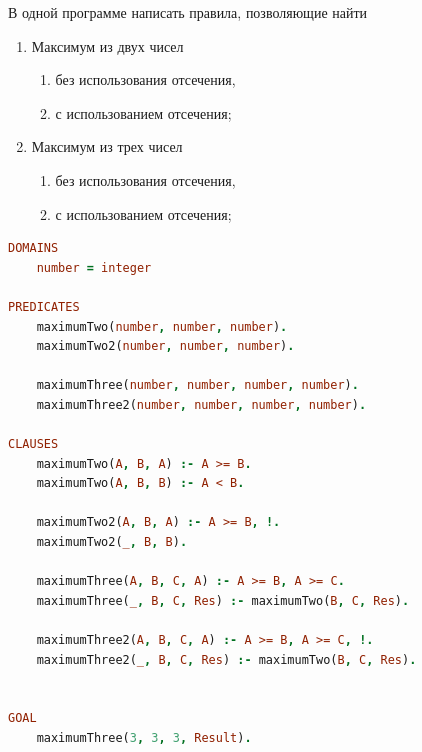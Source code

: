 \documentclass[a4paper,oneside,12pt]{extreport}
\begin{document}
\begin{task}
    В одной программе написать правила, позволяющие найти

    \begin{enumerate}
        \item Максимум из двух чисел
        \begin{enumerate}
            \item без использования отсечения,
            \item с использованием отсечения;
        \end{enumerate}
        \item Максимум из трех чисел
        \begin{enumerate}
            \item без использования отсечения,
            \item с использованием отсечения;
        \end{enumerate}
    \end{enumerate}

    \begin{lstlisting}[language=Prolog]
DOMAINS 
    number = integer

PREDICATES
    maximumTwo(number, number, number).
    maximumTwo2(number, number, number).

    maximumThree(number, number, number, number).
    maximumThree2(number, number, number, number).
    
CLAUSES
    maximumTwo(A, B, A) :- A >= B.
    maximumTwo(A, B, B) :- A < B.
    
    maximumTwo2(A, B, A) :- A >= B, !.
    maximumTwo2(_, B, B).
    
    maximumThree(A, B, C, A) :- A >= B, A >= C.
    maximumThree(_, B, C, Res) :- maximumTwo(B, C, Res).
    
    maximumThree2(A, B, C, A) :- A >= B, A >= C, !.
    maximumThree2(_, B, C, Res) :- maximumTwo(B, C, Res). 
    
    
GOAL
    maximumThree(3, 3, 3, Result).       
    \end{lstlisting}


\end{task}
\end{document}
